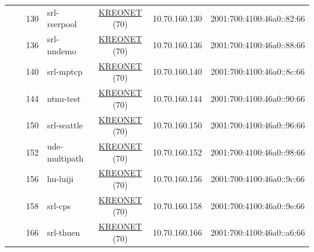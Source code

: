 \begin{small}
\begin{center}
\begin{longtable}{|c|c|c|c|c|c|c|c|}
  &  & \tiny{130} & \multicolumn{1}{|l|}{\tiny{srl-rserpool}} & \multicolumn{2}{|c|}{\tiny{\href{http://www.kreonet.net}{KREONET} (70)}} & \tiny{10.70.160.130} & \tiny{2001:700:4100:46a0::82:66} \\* \cline{3-3}\cline{4-4}\cline{5-5}\cline{6-6}\cline{7-7}\cline{8-8}
  &  & \tiny{136} & \multicolumn{1}{|l|}{\tiny{srl-nndemo}} & \multicolumn{2}{|c|}{\tiny{\href{http://www.kreonet.net}{KREONET} (70)}} & \tiny{10.70.160.136} & \tiny{2001:700:4100:46a0::88:66} \\* \cline{3-3}\cline{4-4}\cline{5-5}\cline{6-6}\cline{7-7}\cline{8-8}
  &  & \tiny{140} & \multicolumn{1}{|l|}{\tiny{srl-mptcp}} & \multicolumn{2}{|c|}{\tiny{\href{http://www.kreonet.net}{KREONET} (70)}} & \tiny{10.70.160.140} & \tiny{2001:700:4100:46a0::8c:66} \\* \cline{3-3}\cline{4-4}\cline{5-5}\cline{6-6}\cline{7-7}\cline{8-8}
  &  & \tiny{144} & \multicolumn{1}{|l|}{\tiny{ntnu-test}} & \multicolumn{2}{|c|}{\tiny{\href{http://www.kreonet.net}{KREONET} (70)}} & \tiny{10.70.160.144} & \tiny{2001:700:4100:46a0::90:66} \\* \cline{3-3}\cline{4-4}\cline{5-5}\cline{6-6}\cline{7-7}\cline{8-8}
  &  & \tiny{150} & \multicolumn{1}{|l|}{\tiny{srl-seattle}} & \multicolumn{2}{|c|}{\tiny{\href{http://www.kreonet.net}{KREONET} (70)}} & \tiny{10.70.160.150} & \tiny{2001:700:4100:46a0::96:66} \\* \cline{3-3}\cline{4-4}\cline{5-5}\cline{6-6}\cline{7-7}\cline{8-8}
  &  & \tiny{152} & \multicolumn{1}{|l|}{\tiny{ude-multipath}} & \multicolumn{2}{|c|}{\tiny{\href{http://www.kreonet.net}{KREONET} (70)}} & \tiny{10.70.160.152} & \tiny{2001:700:4100:46a0::98:66} \\* \cline{3-3}\cline{4-4}\cline{5-5}\cline{6-6}\cline{7-7}\cline{8-8}
  &  & \tiny{156} & \multicolumn{1}{|l|}{\tiny{hu-luiji}} & \multicolumn{2}{|c|}{\tiny{\href{http://www.kreonet.net}{KREONET} (70)}} & \tiny{10.70.160.156} & \tiny{2001:700:4100:46a0::9c:66} \\* \cline{3-3}\cline{4-4}\cline{5-5}\cline{6-6}\cline{7-7}\cline{8-8}
  &  & \tiny{158} & \multicolumn{1}{|l|}{\tiny{srl-cps}} & \multicolumn{2}{|c|}{\tiny{\href{http://www.kreonet.net}{KREONET} (70)}} & \tiny{10.70.160.158} & \tiny{2001:700:4100:46a0::9e:66} \\* \cline{3-3}\cline{4-4}\cline{5-5}\cline{6-6}\cline{7-7}\cline{8-8}
  &  & \tiny{166} & \multicolumn{1}{|l|}{\tiny{srl-thuen}} & \multicolumn{2}{|c|}{\tiny{\href{http://www.kreonet.net}{KREONET} (70)}} & \tiny{10.70.160.166} & \tiny{2001:700:4100:46a0::a6:66} \\ \hline

\end{longtable}
\end{center}
\end{small}
